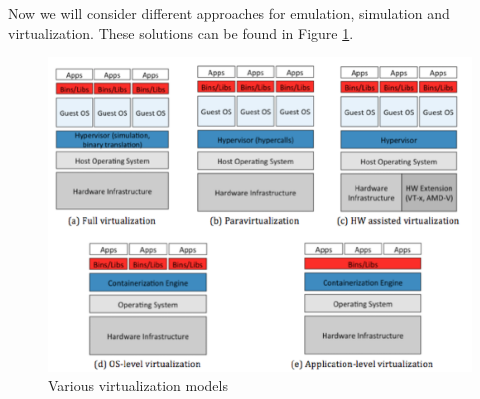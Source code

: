 Now we will consider different approaches for emulation, simulation and virtualization. These solutions can be found in Figure \ref{fig:virtualization_stacks}.
\begin{figure}
    \centering
    \includegraphics[scale=0.4]{img/virtualization_stacks.png}
    \caption{Various virtualization models}
    \label{fig:virtualization_stacks}
\end{figure}
